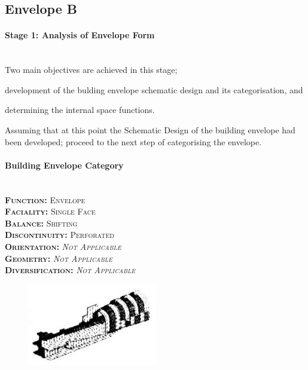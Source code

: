 \clearpage
\subsection{Envelope B}

\paragraph{Stage 1: Analysis of Envelope Form}\mbox{}\\[2mm]

Two main objectives are achieved in this stage; \begin{inparaenum}[a)] \item development of the bulding envelope schematic design and its categorisation, and \item determining the internal space functions.\end{inparaenum}

Assuming that at this point the Schematic Design of the building envelope had been developed; proceed to the next step of categorising the envelope.

\setlength{\columnseprule}{0pt}
\begin{multicols}{2}
	\paragraph{Building Envelope Category}\mbox{}\\
	\vspace {0.5cm}	
	\small \textsc{\textbf{Function:} Envelope\\
	\vspace {0.3cm}
	\textbf{Faciality:} Single Face\\
	\vspace {0.3cm}
	\textbf{Balance:} Shifting\\
	\vspace {0.3cm}
	\textbf{Discontinuity:} Perforated\\
	\vspace {0.3cm}
	\textbf{Orientation:} \emph{Not Applicable}\\
	\vspace {0.3cm}
	\textbf{Geometry:} \emph{Not Applicable}\\
	\vspace {0.3cm}
	\textbf{Diversification:} \emph{Not Applicable}\\}
	\normalsize
	\columnbreak
	\vspace{4cm}
	\begin{figure}[H]
		\centering
		\includegraphics[width=0.5\textwidth]{./Images/13-Envelope4}
	\end{figure}
\end{multicols}
\vspace{-5mm}

